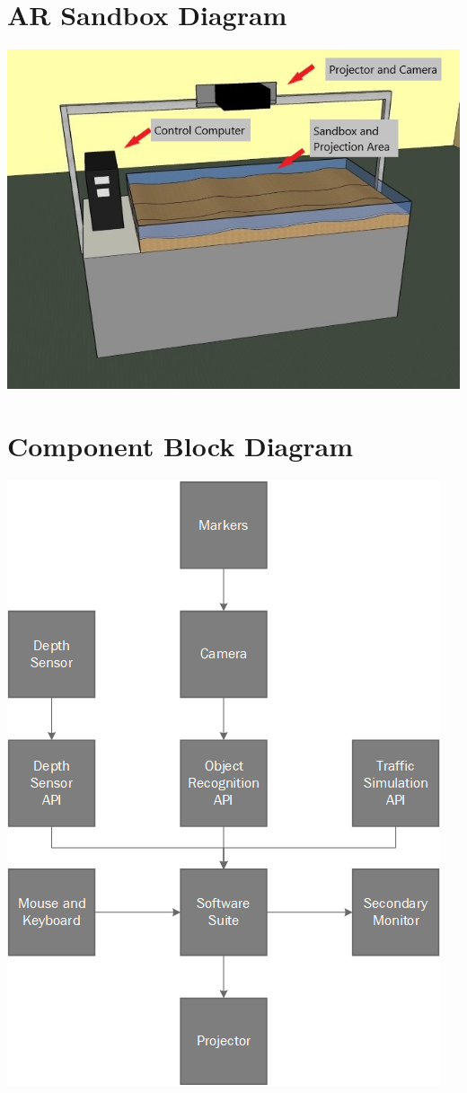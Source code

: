 \documentclass[letterpaper, 10pt, onecolumn, draftclsnofoot]{IEEEtran}
\begin{document}
    \section{AR Sandbox Diagram}
    \label{ARSandboxDiagram}
        \begin{center}
        \includegraphics{ARSandbox.jpg}
        \end{center}
    \section{Component Block Diagram}
    \label{ComponentBlockDiagram}
        \begin{center}
        \includegraphics{BlockDiagram.png}
        \end{center}
\end{document}
